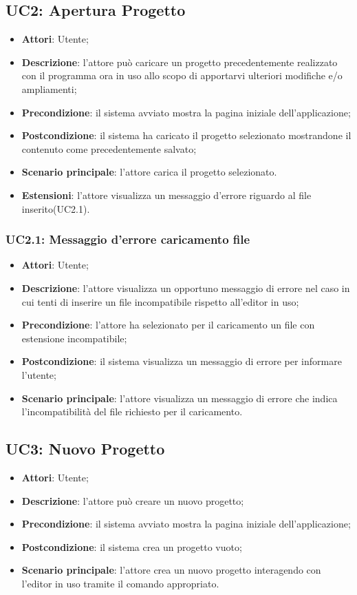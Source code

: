 \subsection{UC2: Apertura Progetto}
\label{UC2}
	\begin{itemize}
		\item \textbf{Attori}: Utente;
		\item \textbf{Descrizione}: l'attore può caricare un progetto precedentemente realizzato con il programma ora in uso allo scopo di apportarvi 		ulteriori modifiche e/o ampliamenti;
		\item \textbf{Precondizione}: il sistema avviato mostra la pagina iniziale dell'applicazione;
		\item \textbf{Postcondizione}: il sistema ha caricato il progetto selezionato mostrandone il contenuto come precedentemente salvato;
		\item \textbf{Scenario principale}:
l'attore carica il progetto selezionato.
		\item \textbf{Estensioni}:
l'attore visualizza un messaggio d'errore riguardo al file inserito(UC2.1).
	\end{itemize}

	\subsubsection{UC2.1: Messaggio d'errore caricamento file}
	\label{UC2.1}
		\begin{itemize}
			\item \textbf{Attori}: Utente;
			\item \textbf{Descrizione}: l'attore visualizza un opportuno messaggio di errore nel caso in cui tenti di inserire un file incompatibile rispetto all'editor in uso;
			\item \textbf{Precondizione}: l'attore ha selezionato per il caricamento un file con estensione incompatibile;
			\item \textbf{Postcondizione}: il sistema visualizza un messaggio di errore per informare l'utente;
			\item \textbf{Scenario principale}: l'attore visualizza un messaggio di errore che indica l'incompatibilità del file richiesto per il caricamento.
		\end{itemize}

\subsection{UC3: Nuovo Progetto}
\label{UC3}
\begin{itemize}
\item \textbf{Attori}: Utente;
\item \textbf{Descrizione}: l'attore può creare un nuovo progetto; 
\item \textbf{Precondizione}: il sistema avviato mostra la pagina iniziale dell'applicazione;
\item \textbf{Postcondizione}: il sistema crea un progetto vuoto;
\item \textbf{Scenario principale}:
l'attore crea un nuovo progetto interagendo con l'editor in uso tramite il comando appropriato.
\end{itemize}


